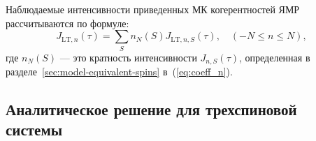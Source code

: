 Наблюдаемые интенсивности приведенных МК когерентностей ЯМР рассчитываются по формуле:
%
\begin{equation}\label{eq:coherence_k}
  J_{\mathrm{LT}, n}(\tau) = \sum\limits_S n_N(S) J_{\mathrm{LT}, n, S}(\tau),
  \quad
  (-N\leq n \leq N),
\end{equation}
%
где $n_N(S)$ --- это кратность интенсивности $J_{n, S}(\tau)$,
определенная в разделе~\ref{sec:model-equivalent-spins} в~(\ref{eq:coeff_n}).


\subsection{Аналитическое решение для трехспиновой системы}
\label{sec:sec:nanopora-thermodynamic-equilibrium-exact_sol}


